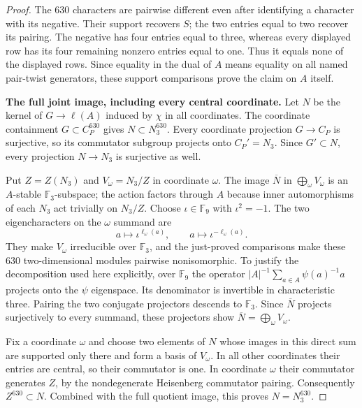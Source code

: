 \begin{proof}
The 630 characters are pairwise different even after
identifying a character with its negative.  Their support
recovers $S$; the two entries equal to two recover its
pairing.  The negative has four entries equal to three,
whereas every displayed row has its four remaining
nonzero entries equal to one.  Thus it equals none of
the displayed rows.  Since equality in the dual of $A$
means equality on all named pair-twist generators,
these support comparisons prove the claim on $A$ itself.

\par\medskip\noindent\textbf{The full joint image, including every central coordinate.}\quad
Let $N$ be the kernel of $G\to\ell(A)$ induced by
$\chi$ in all coordinates.  The coordinate containment
$G\subset C_P^{630}$ gives $N\subset N_3^{630}$.
Every coordinate projection $G\to C_P$ is surjective,
so its commutator subgroup projects onto $C_P'=N_3$.
Since $G'\subset N$, every projection $N\to N_3$
is surjective as well.

Put $Z=Z(N_3)$ and $V_\omega=N_3/Z$ in coordinate
$\omega$.  The image $\overline N$ in
$\bigoplus_\omega V_\omega$ is an $A$-stable
$\mathbb F_3$-subspace; the action factors through $A$
because inner automorphisms of each $N_3$ act trivially
on $N_3/Z$.  Choose $\iota\in\mathbb F_9$ with
$\iota^2=-1$.  The two eigencharacters on the
$\omega$ summand are
\[
       a\longmapsto\iota^{\ell_\omega(a)},
       \qquad a\longmapsto\iota^{-\ell_\omega(a)}.
                                                               \tag{JQT.10}
\]
They make $V_\omega$ irreducible over $\mathbb F_3$,
and the just-proved comparisons make these 630
two-dimensional modules pairwise nonisomorphic.
To justify the decomposition used here explicitly,
over $\mathbb F_9$ the operator
$|A|^{-1}\sum_{a\in A}\psi(a)^{-1}a$ projects onto
the $\psi$ eigenspace.  Its denominator is invertible
in characteristic three.  Pairing the two conjugate
projectors descends to $\mathbb F_3$.  Since
$\overline N$ projects surjectively to every summand,
these projectors show
$\overline N=\bigoplus_\omega V_\omega$.

Fix a coordinate $\omega$ and choose two elements of
$N$ whose images in this direct sum are supported only
there and form a basis of $V_\omega$.  In all other
coordinates their entries are central, so their
commutator is one.  In coordinate $\omega$ their
commutator generates $Z$, by the nondegenerate
Heisenberg commutator pairing.  Consequently
$Z^{630}\subset N$.  Combined with the full quotient
image, this proves $N=N_3^{630}$.


\end{proof}
